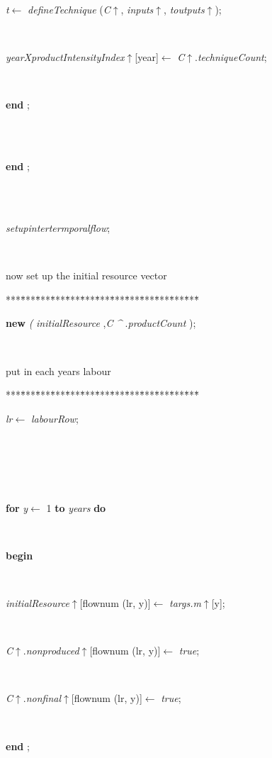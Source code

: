 \documentclass[10pt, a4paper]{article}
\begin{document}
\begin{tabbing}
\parbox{14cm}{\textsf{\textit{t}$\leftarrow$ \textit{defineTechnique} (\textit{C}$\uparrow$\textit{}, \textit{inputs}$\uparrow$\textit{}, \textit{toutputs}$\uparrow$\textit{})}; }\\
\parbox{14cm}{\textsf{\textit{yearXproductIntensityIndex}$\uparrow$\textit{}[year]$\leftarrow$ \textit{C}$\uparrow$.\textit{techniqueCount}}; }\\
\<\-\parbox{14cm}{\textsf{\textbf{end} ;}}\\
\\
\<\-\parbox{14cm}{\textsf{\textbf{end} ;}}\\
\\
\parbox{14cm}{\textsf{\textit{setupintertermporalflow}}; }\\
\end{tabbing}
now set up the initial resource vector
\begin{tabbing}
***\=***\=***\=***\=***\=***\=***\=***\=***\=***\=***\=***\=***\=\kill
\+ \\
\parbox{14cm}{\textsf{\textbf{new} \textit{(} \textit{initialResource}  ,\textit{C} \textit{\^{}} .\textit{productCount} );}}\\
\end{tabbing}
put in each years labour
\begin{tabbing}
***\=***\=***\=***\=***\=***\=***\=***\=***\=***\=***\=***\=***\=\kill
\+ \\
\parbox{14cm}{\textsf{\textit{lr}$\leftarrow$ \textit{labourRow}}; }\\
\\
\\
\\
\+\parbox{14cm}{\textsf {\textbf {for } \textsf{\textit{y}$\leftarrow$ 1} \textbf{ to } \textsf{\textit{years}} \textbf{ do } }}\\
\<\parbox{14cm}{\textsf{\textbf{begin} }}\\
\parbox{14cm}{\textsf{\textit{initialResource}$\uparrow$\textit{}[flownum (lr, y)]$\leftarrow$ \textit{targs.m}$\uparrow$\textit{}[y]}; }\\
\parbox{14cm}{\textsf{\textit{C}$\uparrow$.\textit{nonproduced}$\uparrow$\textit{}[flownum (lr, y)]$\leftarrow$ \textit{true}}; }\\
\parbox{14cm}{\textsf{\textit{C}$\uparrow$.\textit{nonfinal}$\uparrow$\textit{}[flownum (lr, y)]$\leftarrow$ \textit{true}}; }\\
\<\-\parbox{14cm}{\textsf{\textbf{end} ;}}\\
\\
\end{tabbing}
\end{document}

